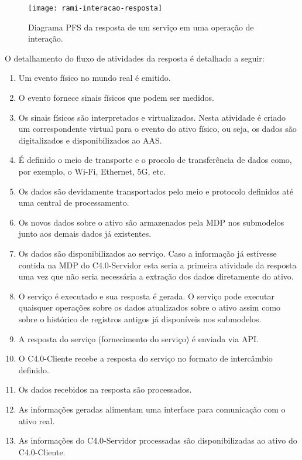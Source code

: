 	\begin{figure}[htb]
		\centering
		\caption{Diagrama PFS da resposta de um serviço em uma operação de interação.}
		\label{fig:rami-interacao-resposta}
		\texttt{[image: rami-interacao-resposta]}
	\end{figure}
	
	O detalhamento do fluxo de atividades da resposta é detalhado a seguir:
	
	\begin{enumerate}
		
		\item Um evento físico no mundo real é emitido.
		
		\item O evento fornece sinais físicos que podem ser medidos.
		 
		\item Os sinais físicos são interpretados e virtualizados. Nesta atividade é criado um correspondente virtual para o evento do ativo físico, ou seja, os dados são digitalizados e disponibilizados ao AAS.
		
		\item É definido o meio de transporte e o procolo de transferência de dados como, por exemplo, o Wi-Fi, Ethernet, 5G, etc.
		
		\item Os dados são devidamente transportados pelo meio e protocolo definidos até uma central de processamento.
		
		\item Os novos dados sobre o ativo são armazenados pela MDP nos submodelos junto aos demais dados já existentes.
		
		\item Os dados são disponibilizados ao serviço. Caso a informação já estivesse contida na MDP do C4.0-Servidor esta seria a primeira atividade da resposta uma vez que não seria necessária a extração dos dados diretamente do ativo.
		
		\item O serviço é executado e sua resposta é gerada. O serviço pode executar quaisquer operações sobre os dados atualizados sobre o ativo assim como sobre o histórico de registros antigos já disponíveis nos submodelos.
		
		\item A resposta do serviço (fornecimento do serviço) é enviada via API.
		
		\item O C4.0-Cliente recebe a resposta do serviço no formato de intercâmbio definido.
		
		\item Os dados recebidos na resposta são processados.
		
		\item As informações geradas alimentam uma interface para comunicação com o ativo real.
		
		\item As informações do C4.0-Servidor processadas são disponibilizadas ao ativo do C4.0-Cliente.
	\end{enumerate}
	